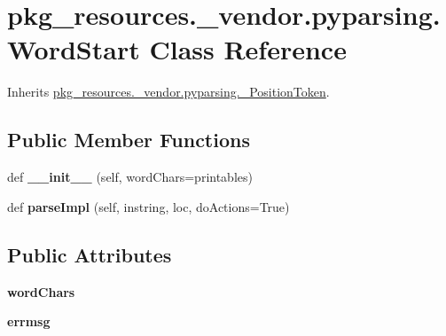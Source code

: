 \hypertarget{classpkg__resources_1_1__vendor_1_1pyparsing_1_1_word_start}{}\section{pkg\+\_\+resources.\+\_\+vendor.\+pyparsing.\+Word\+Start Class Reference}
\label{classpkg__resources_1_1__vendor_1_1pyparsing_1_1_word_start}


Inherits \hyperlink{classpkg__resources_1_1__vendor_1_1pyparsing_1_1___position_token}{pkg\+\_\+resources.\+\_\+vendor.\+pyparsing.\+\_\+\+Position\+Token}.

\subsection*{Public Member Functions}
\begin{DoxyCompactItemize}
\item 
\mbox{\label{classpkg__resources_1_1__vendor_1_1pyparsing_1_1_word_start_a831062c51876abb4ae5547bc3106a1cd}} 
def {\bfseries \+\_\+\+\_\+init\+\_\+\+\_\+} (self, word\+Chars=printables)
\item 
\mbox{\label{classpkg__resources_1_1__vendor_1_1pyparsing_1_1_word_start_a3527eebc17d62454214d6bf543db986b}} 
def {\bfseries parse\+Impl} (self, instring, loc, do\+Actions=True)
\end{DoxyCompactItemize}
\subsection*{Public Attributes}
\begin{DoxyCompactItemize}
\item 
\mbox{\label{classpkg__resources_1_1__vendor_1_1pyparsing_1_1_word_start_ab890bc5bfb9970e5a2ff4394b4a52bf0}} 
{\bfseries word\+Chars}
\item 
\mbox{\label{classpkg__resources_1_1__vendor_1_1pyparsing_1_1_word_start_a66ee823834a600df42eedf637704b0e5}} 
{\bfseries errmsg}
\end{DoxyCompactItemize}
